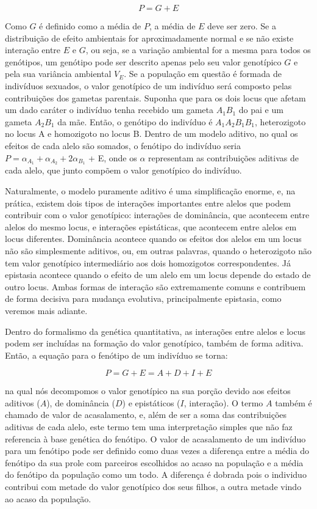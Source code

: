 \begin{refsection}
\begin{equation}
P = G + E
\end{equation}

Como $G$ é definido como a média de $P$, a média de $E$ deve ser zero. Se a
distribuição de efeito ambientais for aproximadamente normal e se não existe
interação entre $E$ e $G$, ou seja, se a variação ambiental for a mesma para
todos os genótipos, um genótipo pode ser descrito apenas pelo seu valor
genotípico $G$ e pela sua variância ambiental $V_E$. Se a população em questão
é formada de indivíduos sexuados, o valor genotípico de um indivíduo será
composto pelas contribuições dos gametas parentais. Suponha que para os dois
locus que afetam um dado caráter o indivíduo tenha recebido um gameta $A_1B_1$
do pai e um gameta $A_2B_1$ da mãe. Então, o genótipo do indivíduo é
$A_1A_2B_1B_1$, heterozigoto no locus A e homozigoto no locus B. Dentro de um
modelo aditivo, no qual os efeitos de cada alelo são somados, o fenótipo do
indivíduo seria $P = \alpha_{A_1} + \alpha_{A_2} + 2\alpha_{B_1}$ + E, onde os
$\alpha$ representam as contribuições aditivas de cada alelo, que junto
compõem o valor genotípico do indivíduo. 

Naturalmente, o modelo puramente aditivo é uma simplificação enorme, e, na
prática, existem dois tipos de interações importantes entre alelos que podem
contribuir com o valor genotípico: interações de dominância, que acontecem
entre alelos do mesmo locus, e interações epistáticas, que acontecem entre
alelos em locus diferentes. Dominância acontece quando os efeitos dos alelos
em um locus não são simplesmente aditivos, ou, em outras palavras, quando o
heterozigoto não tem valor genotípico intermediário aos dois homozigotos
correspondentes. Já epistasia acontece quando o efeito de um alelo em um locus
depende do estado de outro locus. Ambas formas de interação são extremamente
comuns e contribuem de forma decisiva para mudança evolutiva, principalmente
epistasia, como veremos mais adiante.

Dentro do formalismo da genética quantitativa, as interações entre alelos e locus podem ser incluídas na formação do valor genotípico, também de forma aditiva. Então, a equação para o fenótipo de um indivíduo se torna:

\begin{equation}
P = G + E = A +D + I + E
\end{equation}

na qual nós decompomos o valor genotípico na sua porção devido aos efeitos
aditivos ($A$), de dominância ($D$) e epistáticos ($I$, interação). O termo
$A$ também é chamado de valor de acasalamento, e, além de ser a soma das
contribuições aditivas de cada alelo, este termo tem uma interpretação simples
que não faz referencia à base genética do fenótipo. O valor de acasalamento de
um indivíduo para um fenótipo pode ser definido como duas vezes a diferença
entre a média do fenótipo da sua prole com parceiros escolhidos ao acaso na
população e a média do fenótipo da população como um todo. A diferença é
dobrada pois o individuo contribui com metade do valor genotípico dos seus
filhos, a outra metade vindo ao acaso da população.


\end{refsection}

